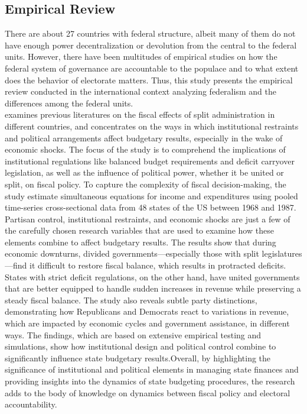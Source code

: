 \subsection{Empirical Review} \vspace{-3mm}
There are about 27 countries with federal structure, albeit many of them do not have enough power decentralization or devolution from the central to the federal units. However, there have been multitudes of empirical studies on how the federal system of governance are accountable to the populace and to what extent does the behavior of electorate matters. Thus, this study presents the empirical review conducted in the international context analyzing federalism and the differences among the federal units. \\
 examines previous literatures on the fiscal effects of split administration in different countries, and concentrates on the ways in which institutional restraints and political arrangements affect budgetary results, especially in the wake of economic shocks. The focus of the study is to comprehend the implications of institutional regulations like balanced budget requirements and deficit carryover legislation, as well as the influence of political power, whether it be united or split, on fiscal policy. To capture the complexity of fiscal decision-making, the study estimate simultaneous equations for income and expenditures using pooled time-series cross-sectional data from 48 states of the US between 1968 and 1987. Partisan control, institutional restraints, and economic shocks are just a few of the carefully chosen research variables that are used to examine how these elements combine to affect budgetary results. The results show that during economic downturns, divided governments—especially those with split legislatures—find it difficult to restore fiscal balance, which results in protracted deficits. States with strict deficit regulations, on the other hand, have united governments that are better equipped to handle sudden increases in revenue while preserving a steady fiscal balance. The study also reveals subtle party distinctions, demonstrating how Republicans and Democrats react to variations in revenue, which are impacted by economic cycles and government assistance, in different ways. The findings, which are based on extensive empirical testing and simulations, show how institutional design and political control combine to significantly influence state budgetary results.Overall, by highlighting the significance of institutional and political elements in managing state finances and providing insights into the dynamics of state budgeting procedures, the research adds to the body of knowledge on dynamics between fiscal policy and electoral accountability.\\
